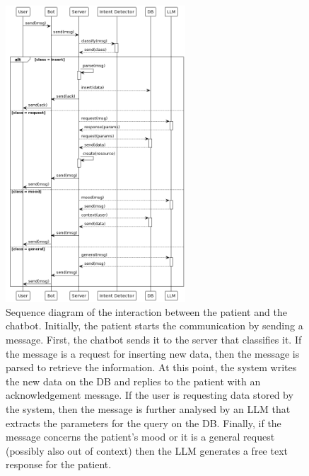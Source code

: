 \begin{figure}[ht!]
	\centering
	\includegraphics[width=0.6\textwidth]{figures/sequence_diagram.png}
	\caption{
            Sequence diagram of the interaction between the patient and the chatbot. 
            Initially, the patient starts the communication by sending a message. 
            First, the chatbot sends it to the server that classifies it. 
            If the message is a request for inserting new data, then the message is parsed to retrieve the information. 
            At this point, the system writes the new data on the DB and replies to the patient with an acknowledgement message. 
            If the user is requesting data stored by the system, then the message is further analysed by an LLM that extracts the parameters for the query on the DB.
            Finally, if the message concerns the patient’s mood or it is a general request (possibly also out of context) then the LLM generates a free text response for the patient.
        }
	\label{fig:seq}
\end{figure}

